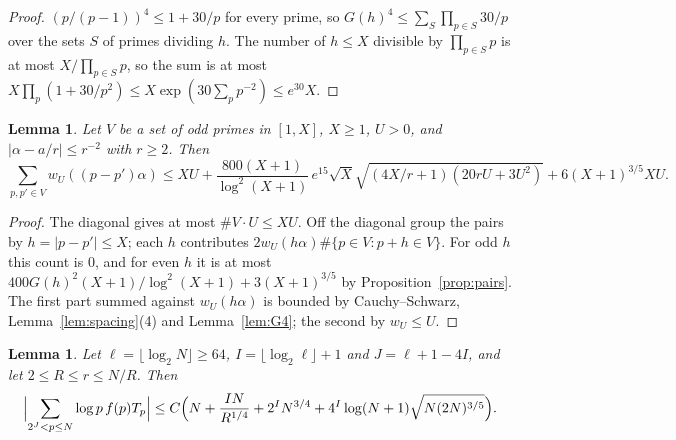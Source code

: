 \documentclass[11pt]{amsart}
\newtheorem{lemma}[theorem]{Lemma}
\theoremstyle{definition}
\theoremstyle{remark}
\numberwithin{equation}{section}
\newcommand{\e}{e}
\begin{document}
\begin{proof}
$(p/(p-1))^4\le1+30/p$ for every prime, so $G(h)^4\le\sum_{S}\prod_{p\in S}30/p$ over
the sets $S$ of primes dividing $h$. The number of $h\le X$ divisible by
$\prod_{p\in S}p$ is at most $X/\prod_{p\in S}p$, so the sum is at most
$X\prod_p(1+30/p^2)\le X\exp(30\sum_pp^{-2})\le\e^{30}X$.
\end{proof}

\begin{lemma}\label{lem:W}
Let $V$ be a set of odd primes in $[1,X]$, $X\ge1$, $U>0$, and $|\alpha-a/r|\le r^{-2}$
with $r\ge2$. Then
\[
\sum_{p,p'\in V}w_U((p-p')\alpha)\le XU+\frac{800(X+1)}{\log^2(X+1)}\,\e^{15}\sqrt X\sqrt{(4X/r+1)(20rU+3U^2)}+6(X+1)^{3/5}XU .
\]
\end{lemma}

\begin{proof}
The diagonal gives at most $\#V\cdot U\le XU$. Off the diagonal group the pairs
by $h=|p-p'|\le X$; each $h$ contributes $2w_U(h\alpha)\#\{p\in V:p+h\in V\}$.
For odd $h$ this count is $0$, and for even $h$ it is at most
$400G(h)^2(X+1)/\log^2(X+1)+3(X+1)^{3/5}$ by Proposition~\ref{prop:pairs}. The first
part summed against $w_U(h\alpha)$ is bounded by Cauchy--Schwarz,
Lemma~\ref{lem:spacing}(4) and Lemma~\ref{lem:G4}; the second by $w_U\le U$.
\end{proof}

\begin{lemma}\label{lem:large}
Let $\ell=\lfloor\log_2N\rfloor\ge64$, $I=\lfloor\log_2\ell\rfloor+1$ and $J=\ell+1-4I$,
and let $2\le R\le r\le N/R$. Then
\[
\Bigl|\sum_{2^J<p\le N}\log p\,f(p)T_p\Bigr|\le
C\Bigl(N+\frac{IN}{R^{1/4}}+2^IN^{3/4}+4^I\log(N+1)\sqrt{N(2N)^{3/5}}\Bigr).
\]
\end{lemma}
\end{document}
